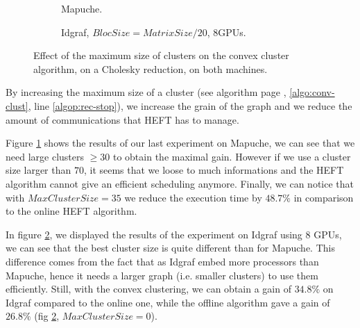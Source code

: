 \documentclass[10pt, conference, compsocconf,pdftex,dvipsnames]{IEEEtran}
\begin{document}
\begin{figure}[tb]
    \centering
    \begin{subfigure}{0.4\textwidth}
        \hspace{-20pt}
        \scalebox{0.7}{
            
        }
        \caption{Mapuche.}
        \label{fig:ClustersMapuche}
    \end{subfigure}
    \hspace{15pt}
    \begin{subfigure}{0.55\textwidth}
        \scalebox{0.7}{
            
        }
        \caption{Idgraf, $BlocSize=MatrixSize/20$, $8$GPUs.}
        \label{fig:ClustersIdgraf}
    \end{subfigure}

    \caption{Effect of the maximum size of clusters on the convex cluster
    algorithm, on a Cholesky reduction, on both machines.}
    \label{fig:Clusters}
\end{figure}

By increasing the maximum size of a cluster (see algorithm
page \pageref{algo:conv-clust}, \ref{algo:conv-clust}, line
\ref{algop:rec-stop}), we increase the grain of the graph and we reduce the
amount of communications that HEFT has to manage.

Figure \ref{fig:ClustersMapuche} shows the results of our last experiment on
Mapuche, we can see that we need large clusters $\geq 30$ to obtain the maximal
gain. However if we use a cluster size larger than $70$, it seems that we
loose to much informations and the HEFT algorithm cannot give an efficient
scheduling anymore. Finally, we can notice that with $MaxClusterSize=35$ we
reduce the execution time by $48.7\%$ in comparison to the online HEFT
algorithm.

In figure \ref{fig:ClustersIdgraf}, we displayed the results of the
experiment on Idgraf using $8$ GPUs, we can see that the best cluster size is
quite different than for Mapuche. This difference comes from the fact that as
Idgraf embed more processors than Mapuche, hence it needs a larger graph (i.e.
smaller clusters) to use them efficiently. Still, with the convex clustering,
we can obtain a gain of $34.8\%$ on Idgraf compared to the online one, while
the offline algorithm gave a gain of $26.8\%$ (fig
\ref{fig:ClustersIdgraf}, $MaxClusterSize=0$).
\end{document}
